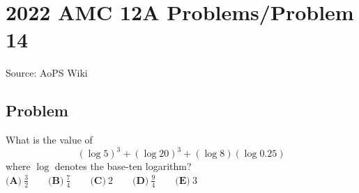 \documentclass[12pt]{article}
\begin{document}
\section*{{2022 AMC 12A Problems/Problem 14}}
Source: AoPS Wiki

\subsection*{Problem}
What is the value of \[(\log 5)^{3}+(\log 20)^{3}+(\log 8)(\log 0.25)\] where $\log$ denotes the base-ten logarithm? $\textbf{(A)}~\frac{3}{2}\qquad\textbf{(B)}~\frac{7}{4}\qquad\textbf{(C)}~2\qquad\textbf{(D)}~\frac{9}{4}\qquad\textbf{(E)}~3$
\end{document}
